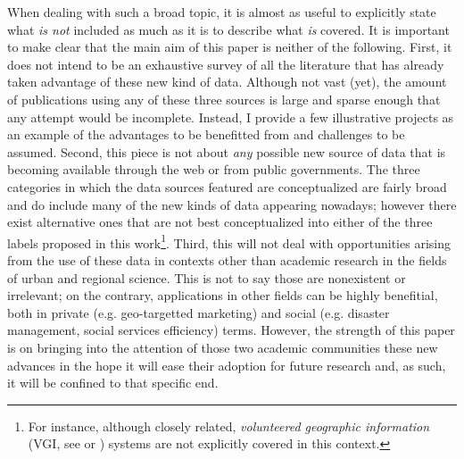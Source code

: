 \documentclass[12pt]{article}
\begin{document}
When dealing with such a broad topic, it is almost as useful to explicitly state what
\emph{is not} included as much as it is to describe what \emph{is} covered.
It is important to make clear that the main aim of this paper is
neither of the following.
First, it does not intend to be an exhaustive survey of all the 
literature that has already taken advantage of these new kind of data.
Although not vast (yet), the amount of publications using any of these three
sources is large and sparse enough that any attempt would be incomplete. Instead, I provide
a few illustrative projects as an example of the advantages to be benefitted
from and challenges to be assumed.
Second, this piece is not about \emph{any} possible new source of data that is
becoming available through the web or from public governments. The three
categories in which the data sources featured are conceptualized are fairly
broad and do include many of the new kinds of data appearing nowadays; however
there exist alternative ones that are not best conceptualized into either of the three
labels proposed in this work\footnote{For instance, although closely related,
\emph{volunteered geographic information} (VGI, see \citealp{goodchild2007vgi}
or \citealp{wikfication}) systems are not
explicitly covered in this context.}.
Third, this will not deal with opportunities arising from the use of these
data in contexts other than academic research in the fields of urban and
regional science. 
This is not to say those are nonexistent or irrelevant; on the contrary,
applications in other fields can be highly benefitial,
both in private (e.g. geo-targetted marketing) and social (e.g. disaster
management, social services efficiency) terms.
However, the strength of this paper is on bringing into the attention
of those two academic communities these new advances in
the hope it will ease their adoption for
future research and, as such, it will be confined to that specific end.
\end{document}
